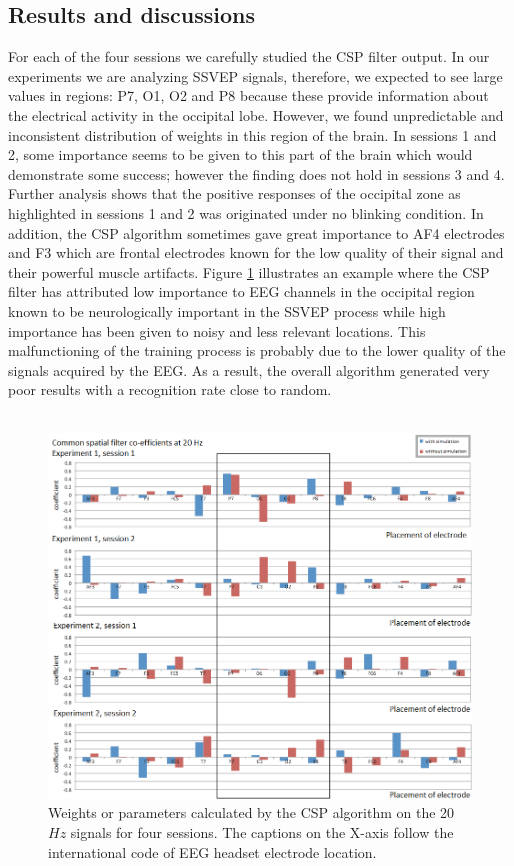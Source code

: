 \documentclass{svmult}
\begin{document}
\subsection{Results and discussions}
For each of the four sessions we carefully studied the CSP filter output. In our experiments we are analyzing SSVEP signals, therefore, we expected to see large values in regions: P7, O1, O2 and P8 because these provide information about the electrical activity in the occipital lobe. However, we found unpredictable and inconsistent distribution of weights in this region of the brain. In sessions 1 and 2, some importance seems to be given to this part of the brain which would demonstrate some success; however the finding does not hold in sessions 3 and 4. Further analysis shows that the positive responses of the occipital zone as highlighted in sessions 1 and 2 was originated under no blinking condition. In addition, the CSP algorithm sometimes gave great importance to AF4 electrodes and F3 which are frontal electrodes known for the low quality of their signal and their powerful muscle artifacts. Figure \ref{fig: CSP_20} illustrates an example where the CSP filter has attributed low importance to EEG channels in the occipital region known to be neurologically important in the SSVEP process while high importance has been given to noisy and less relevant locations. This malfunctioning of the training process is probably due to the lower quality of the signals acquired by the EEG. As a result, the overall algorithm generated very poor results with a recognition rate close to random.\\
\\
\begin{figure}
\center
\includegraphics[width = \textwidth] {figures/Untitled_2.png}
\caption{Weights or parameters calculated by the CSP algorithm on the 20$Hz$ signals for four sessions. The captions on the X-axis follow the international code of EEG headset electrode location.} \label{fig: CSP_20}
\end{figure}
\end{document}
